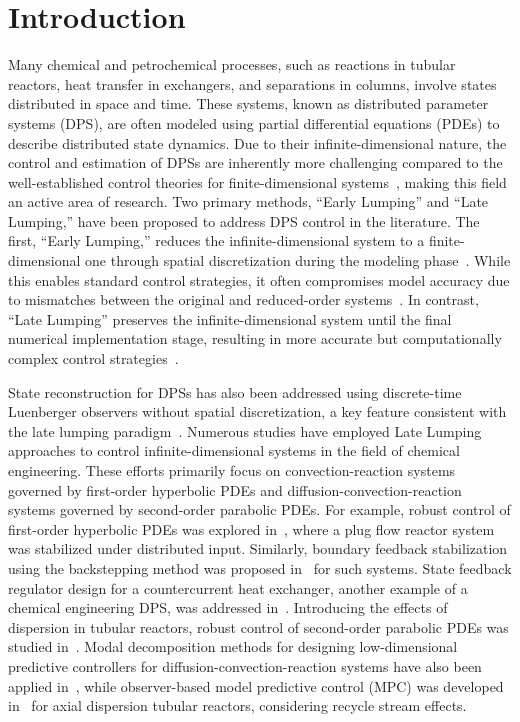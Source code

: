 \section{Introduction}

Many chemical and petrochemical processes, such as reactions in tubular reactors, heat transfer in exchangers, and separations in columns, involve states distributed in space and time. These systems, known as distributed parameter systems (DPS), are often modeled using partial differential equations (PDEs) to describe distributed state dynamics. Due to their infinite-dimensional nature, the control and estimation of DPSs are inherently more challenging compared to the well-established control theories for finite-dimensional systems~\cite{ray1981advanced}, making this field an active area of research. Two primary methods, ``Early Lumping'' and ``Late Lumping,'' have been proposed to address DPS control in the literature. The first, ``Early Lumping,'' reduces the infinite-dimensional system to a finite-dimensional one through spatial discretization during the modeling phase~\cite{davison1976robust}. While this enables standard control strategies, it often compromises model accuracy due to mismatches between the original and reduced-order systems~\cite{moghadam2012infinite}. In contrast, ``Late Lumping'' preserves the infinite-dimensional system until the final numerical implementation stage, resulting in more accurate but computationally complex control strategies~\cite{ray1981advanced}.

State reconstruction for DPSs has also been addressed using discrete-time Luenberger observers without spatial discretization, a key feature consistent with the late lumping paradigm~\cite{dochain2000state,dochain2001state,alonso2004optimal,ali2015review}.
Numerous studies have employed Late Lumping approaches to control infinite-dimensional systems in the field of chemical engineering. These efforts primarily focus on convection-reaction systems governed by first-order hyperbolic PDEs and diffusion-convection-reaction systems governed by second-order parabolic PDEs. For example, robust control of first-order hyperbolic PDEs was explored in~\cite{christofides1996feedback}, where a plug flow reactor system was stabilized under distributed input. Similarly, boundary feedback stabilization using the backstepping method was proposed in~\cite{krstic2008backstepping} for such systems. State feedback regulator design for a countercurrent heat exchanger, another example of a chemical engineering DPS, was addressed in~\cite{xu2016state}. Introducing the effects of dispersion in tubular reactors, robust control of second-order parabolic PDEs was studied in~\cite{christofides1998robust}. Modal decomposition methods for designing low-dimensional predictive controllers for diffusion-convection-reaction systems have also been applied in~\cite{dubljevic2006predictive}, while observer-based model predictive control (MPC) was developed in~\cite{khatibi2021model} for axial dispersion tubular reactors, considering recycle stream effects.

